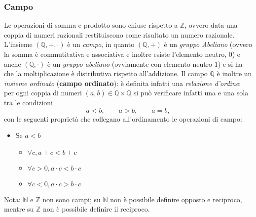 \documentclass[a4paper,12pt, oneside]{book}
\begin{document}
\subsubsection{Campo} Le operazioni di somma e prodotto sono chiuse rispetto a
$\mathbb{Z}$, ovvero data una coppia di numeri razionali restituiscono come
risultato un numero razionale.\\ L'insieme $(\mathbb{Q},+,\cdot)$ è un
\textit{campo}, in quanto $(\mathbb{Q},+)$ è un \textit{gruppo Abeliano} (ovvero
la somma è commutitativa e associativa e inoltre esiste l'elemento neutro, $0$)
e anche $(\mathbb{Q},\cdot)$ è un \textit{gruppo abeliano} (ovviamente con
elemento neutro $1$) e si ha che la moltiplicazione è distributiva rispetto
all'addizione.  Il campo $\mathbb{Q}$ è inoltre un \textit{insieme ordinato}
(\textbf{campo ordinato}): è definita infatti una \textit{relazione d'ordine}:
per ogni coppia di numeri $(a,b)\in\mathbb{Q}\times\mathbb{Q}$ si può verificare
infatti una e una sola tra le condizioni
$$a<b,\qquad a>b,\qquad a=b,$$
con le seguenti proprietà che collegano all'ordinamento le operazioni di campo:
\begin{itemize}
  \item Se $a<b$
  \begin{itemize}
    \item $\forall c, a+c<b+c$
    \item $\forall c>0, a\cdot c<b\cdot c$
    \item $\forall c<0, a\cdot c>b\cdot c$
  \end{itemize}
\end{itemize} Nota: $\mathbb{N}$ e $\mathbb{Z}$ non sono campi; su $\mathbb{N}$
non è possibile definire opposto e reciproco, mentre su $\mathbb{Z}$ non è
possibile definire il reciproco.
\end{document}
